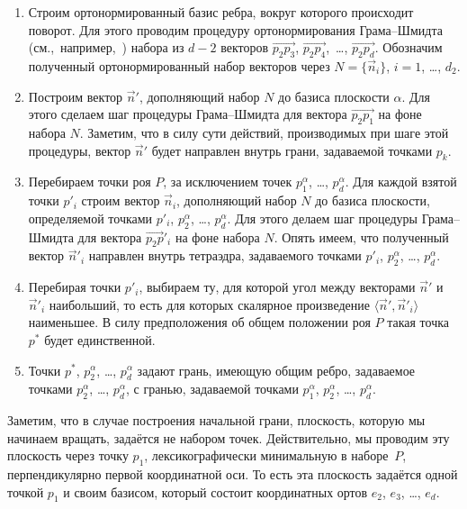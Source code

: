 \documentclass[14pt]{extarticle}
\begin{document}
\begin{enumerate}[topsep=-0.5\parsep,itemsep=-0.5\parsep]
  \item Строим ортонормированный базис ребра, вокруг которого происходит поворот. Для этого проводим процедуру ортонормирования Гра\-ма--Шмид\-та (см.,~например,~\cite{bib:Bekl}) набора из $d-2$ векторов $\overrightarrow{p_2p_3}$, $\overrightarrow{p_2p_4}$,~\ldots, $\overrightarrow{p_2p_d}$. Обозначим полученный ортонормированный набор векторов через $N = \{\vec n_i\}$, $i = 1$, \ldots, $d_2$.

  \item Построим вектор $\vec n'$, дополняющий набор $N$ до базиса плоскости $\alpha$. Для этого сделаем шаг процедуры Грама--Шмидта для вектора $\overrightarrow{p_2p_1}$ на фоне набора $N$. Заметим, что в силу сути действий, производимых при шаге этой процедуры, вектор $\vec n'$ будет направлен внутрь грани, задаваемой точками $p_k$.

  \item Перебираем точки роя $P$, за исключением точек $p^\alpha_1$, \ldots, $p^\alpha_d$. Для каждой взятой точки $p'_i$ строим вектор $\vec n_i$, дополняющий набор $N$ до базиса плоскости, определяемой точками $p'_i$, $p^\alpha_2$, \ldots, $p^\alpha_d$. Для этого делаем шаг процедуры Грама--Шмидта для вектора $\overrightarrow{p_2p}'_i$ на фоне набора $N$. Опять имеем, что полученный вектор $\vec n'_i$ направлен внутрь тетраэдра, задаваемого точками $p'_i$, $p^\alpha_2$, \ldots, $p^\alpha_d$.

  \item Перебирая точки $p'_i$, выбираем ту, для которой угол между векторами $\vec n'$ и $\vec n'_i$ наибольший, то есть для которых скалярное произведение $\langle \vec n', \vec n'_i \rangle$ наименьшее. В силу предположения об общем положении роя $P$ такая точка $p^*$ будет единственной.

  \item Точки $p^*$, $p^\alpha_2$, \ldots, $p^\alpha_d$ задают грань, имеющую общим ребро, задаваемое точками $p^\alpha_2$, \ldots, $p^\alpha_d$, с гранью, задаваемой точками $p^\alpha_1$, $p^\alpha_2$, \ldots, $p^\alpha_d$.
\end{enumerate}

\medskip

Заметим, что в случае построения начальной грани, плоскость, которую мы начинаем вращать, задаётся не набором точек. Действительно, мы проводим эту плоскость через точку $p_1$, лексикографически минимальную в наборе~$P$, перпендикулярно первой координатной оси. То есть эта плоскость задаётся одной точкой $p_1$ и своим базисом, который состоит координатных ортов $e_2$, $e_3$, \ldots, $e_d$.
\end{document}
